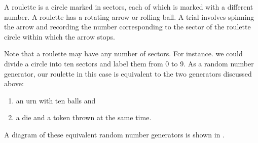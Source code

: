 A roulette is a circle marked in sectors, each of which is marked with
a different number. A roulette has a rotating arrow or rolling ball.
A trial involves spinning the arrow and recording the number
corresponding to the sector of the roulette circle within which the arrow
stops.

Note that a roulette may have any number of sectors. For instance.
we could divide a circle into ten sectors and label them from 0 to 9. As
a random number generator, our roulette in this case is equivalent to
the two generators discussed above: 
\begin{enumerate}[leftmargin=1cm,label=(\arabic*),noitemsep,nolistsep]
\item an urn with ten balls and
\item a die and a token thrown at the same time.
\end{enumerate}
A diagram of these equivalent random number generators is shown in .

